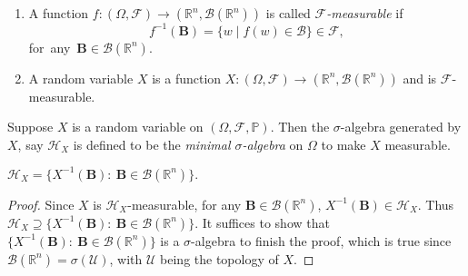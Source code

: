 \begin{definition}
\begin{enumerate}
\item
A function $f:(\Omega,\mathcal{F})\to(\mathbb{R}^n,\mathcal{B}(\mathbb{R}^n))$ is called \emph{$\mathcal{F}$-measurable} if
\[
f^{-1}(\bm B)=\{w\mid f(w)\in\mathcal{B}\}\in\mathcal{F},
\]
\mbox{for any $\bm B\in\mathcal{B}(\mathbb{R}^n)$.}
\item
A random variable $X$ is a function $X:(\Omega,\mathcal{F})\to(\mathbb{R}^n,\mathcal{B}(\mathbb{R}^n))$ and is $\mathcal{F}$-measurable.
\end{enumerate}
\end{definition}

\begin{definition}
Suppose $X$ is a random variable on $(\Omega,\mathcal{F},\mathbb{P})$. 
Then the $\sigma$-algebra generated by $X$, say $\mathcal{H}_X$ is defined to be 
the \emph{minimal $\sigma$-algebra} on $\Omega$ to make $X$ measurable.
\end{definition}
\begin{proposition}
$
\mathcal{H}_X = \{X^{-1}(\bm B):~\bm B\in\mathcal{B}(\mathbb{R}^n)\}.
$
\end{proposition}

\begin{proof}
Since $X$ is $\mathcal{H}_X$-measurable, for any $\bm B\in\mathcal{B}(\mathbb{R}^n)$, $X^{-1}(\bm B)\in\mathcal{H}_X$. Thus $\mathcal{H}_X \supseteq \{X^{-1}(\bm B):~\bm B\in\mathcal{B}(\mathbb{R}^n)\}$.
It suffices to show that $\{X^{-1}(\bm B):~\bm B\in\mathcal{B}(\mathbb{R}^n)\}$ is a $\sigma$-algebra to finish the proof, which is true since $\mathcal{B}(\mathbb{R}^n)=\sigma(\mathcal{U})$, with $\mathcal{U}$ being the topology of $X$.



\end{proof}


















